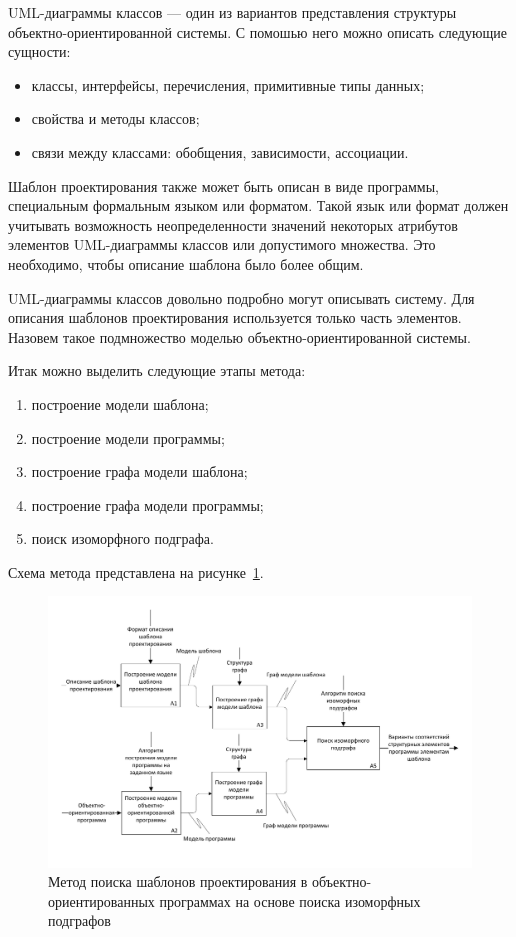 UML-диаграммы классов --- один из вариантов представления структуры
объектно-ориентированной системы.
С помошью него можно описать следующие сущности:
\begin{itemize}
\item классы, интерфейсы, перечисления, примитивные типы данных;
\item свойства и методы классов;
\item связи между классами: обобщения, зависимости, ассоциации.
\end{itemize}

Шаблон проектирования также может быть описан в виде программы, специальным
формальным языком или форматом.
Такой язык или формат должен учитывать возможность неопределенности значений
некоторых атрибутов элементов UML-диаграммы классов или допустимого множества.
Это необходимо, чтобы описание шаблона было более общим.

UML-диаграммы классов довольно подробно могут описывать систему.
Для описания шаблонов проектирования используется только часть элементов.
Назовем такое подмножество моделью объектно-ориентированной системы.

Итак можно выделить следующие этапы метода:
\begin{enumerate}
\item построение модели шаблона;
\item построение модели программы;
\item построение графа модели шаблона;
\item построение графа модели программы;
\item поиск изоморфного подграфа.
\end{enumerate}

Схема метода представлена на рисунке~\ref{fig:idef0-specific}.

\begin{figure}
\centering
\includegraphics[angle=90]{inc/idef0-specific.pdf}
\caption{Метод поиска шаблонов проектирования в объектно-ориентированных программах на основе поиска изоморфных подграфов}
\label{fig:idef0-specific}
\end{figure}
